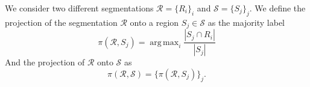 \documentclass[10pt,journal,cspaper,compsoc]{IEEEtran}
\DeclareMathOperator*{\argmax}{arg\,max}
\begin{document}



 
We consider two different segmentations $\mathcal{R} = \{ R_i\}_i$ and $\mathcal{S} = \{ S_j\}_j$. 
We define the projection of the segmentation $\mathcal{R}$ onto a region $S_j \in \mathcal{S}$ as the majority label 
\begin{equation}
\pi(\mathcal{R}, S_j) = \argmax_i \frac{| S_j \cap R_i | }{|S_j|}
\end{equation}
And the projection of $\mathcal{R}$ onto $\mathcal{S}$ as
\begin{equation}
\pi( \mathcal{R}, \mathcal{S}) = \{ \pi(\mathcal{R}, S_j) \}_j.
\label{proj_eq}
\end{equation}
\end{document}
